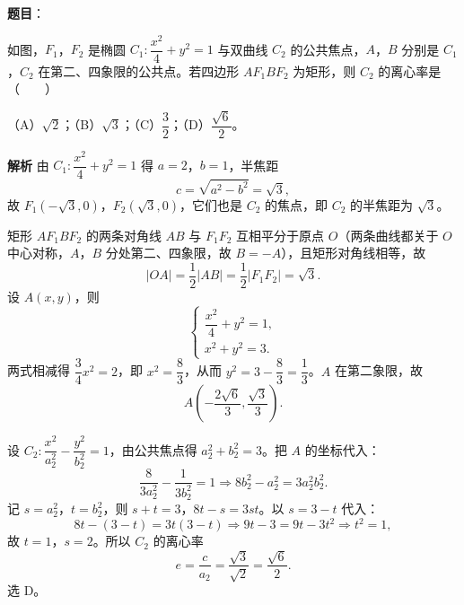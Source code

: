 \begin{answer}

\textbf{题目}：

如图，$F_1$，$F_2$ 是椭圆 $C_1:\dfrac{x^2}4+y^2=1$ 与双曲线 $C_2$ 的公共焦点，$A$，$B$ 分别是 $C_1$，$C_2$ 在第二、四象限的公共点。若四边形 $AF_1BF_2$ 为矩形，则 $C_2$ 的离心率是\mbox{（　　）}
\nopagebreak[4]
\begin{center}\end{center}
\nopagebreak[4]
（A）$\sqrt2$；（B）$\sqrt3$；（C）$\dfrac32$；（D）$\dfrac{\sqrt6}2$。

\textbf{解析}
由 $C_1:\dfrac{x^2}4+y^2=1$ 得 $a=2$，$b=1$，半焦距
\nopagebreak[4]
\[c=\sqrt{a^2-b^2}=\sqrt3,\]
故 $F_1(-\sqrt3,0)$，$F_2(\sqrt3,0)$，它们也是 $C_2$ 的焦点，即 $C_2$ 的半焦距为 $\sqrt3$。

矩形 $AF_1BF_2$ 的两条对角线 $AB$ 与 $F_1F_2$ 互相平分于原点 $O$（两条曲线都关于 $O$ 中心对称，$A$，$B$ 分处第二、四象限，故 $B=-A$），且矩形对角线相等，故
\nopagebreak[4]
\[|OA|=\frac12|AB|=\frac12|F_1F_2|=\sqrt3.\]
设 $A(x,y)$，则
\nopagebreak[4]
\[\begin{cases}\dfrac{x^2}4+y^2=1,\\x^2+y^2=3.\end{cases}\]
两式相减得 $\dfrac34x^2=2$，即 $x^2=\dfrac83$，从而 $y^2=3-\dfrac83=\dfrac13$。$A$ 在第二象限，故
\nopagebreak[4]
\[A\left(-\frac{2\sqrt6}3,\frac{\sqrt3}3\right).\]

设 $C_2:\dfrac{x^2}{a_2^2}-\dfrac{y^2}{b_2^2}=1$，由公共焦点得 $a_2^2+b_2^2=3$。把 $A$ 的坐标代入：
\nopagebreak[4]
\[\frac{8}{3a_2^2}-\frac{1}{3b_2^2}=1\Longrightarrow 8b_2^2-a_2^2=3a_2^2b_2^2.\]
记 $s=a_2^2$，$t=b_2^2$，则 $s+t=3$，$8t-s=3st$。以 $s=3-t$ 代入：
\nopagebreak[4]
\[8t-(3-t)=3t(3-t)\Longrightarrow 9t-3=9t-3t^2\Longrightarrow t^2=1,\]
故 $t=1$，$s=2$。所以 $C_2$ 的离心率
\nopagebreak[4]
\[e=\frac{c}{a_2}=\frac{\sqrt3}{\sqrt2}=\frac{\sqrt6}2.\]
选 D。


\end{answer}
